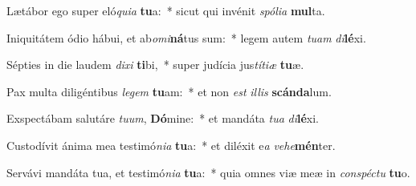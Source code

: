\item Lætábor ego super eló\textit{qui}\textit{a} \textbf{tu}a:~* sicut qui invénit \textit{spó}\textit{li}\textit{a} \textbf{mul}ta.
\item Iniquitátem ódio hábui, et ab\textit{o}\textit{mi}\textbf{ná}tus sum:~* legem autem \textit{tu}\textit{am} \textit{di}\textbf{lé}xi.
\item Sépties in die laudem \textit{di}\textit{xi} \textbf{ti}bi,~* super judícia jus\textit{tí}\textit{ti}\textit{æ} \textbf{tu}æ.
\item Pax multa diligéntibus \textit{le}\textit{gem} \textbf{tu}am:~* et non \textit{est} \textit{il}\textit{lis} \textbf{scán}\textbf{da}lum.
\item Exspectábam salutáre \textit{tu}\textit{um}, \textbf{Dó}mine:~* et mandáta \textit{tu}\textit{a} \textit{di}\textbf{lé}xi.
\item Custodívit ánima mea testimó\textit{ni}\textit{a} \textbf{tu}a:~* et diléxit e\textit{a} \textit{ve}\textit{he}\textbf{mén}ter.
\item Servávi mandáta tua, et testimó\textit{ni}\textit{a} \textbf{tu}a:~* quia omnes viæ meæ in \textit{con}\textit{spéc}\textit{tu} \textbf{tu}o.
